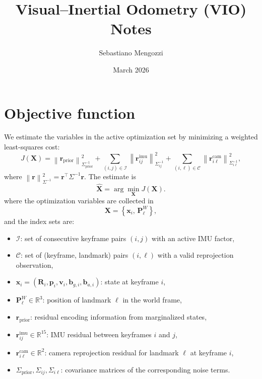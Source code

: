 \documentclass[11pt]{article}
\title{Visual--Inertial Odometry (VIO) Notes}
\author{Sebastiano Mengozzi}
\date{March 2026}
\newcommand{\R}{\mathbb{R}}
\newcommand{\norm}[1]{\left\lVert #1 \right\rVert}
\newcommand{\T}{^{\top}}
\begin{document}
\maketitle

\section{Objective function}

We estimate the variables in the active optimization set by minimizing a weighted least-squares cost:
\begin{equation}
J(\mathbf{X}) = \norm{\mathbf{r}_{\mathrm{prior}}}_{\Sigma_{\mathrm{prior}}^{-1}}^2
+ \sum_{(i,j)\in \mathcal{I}} \norm{\mathbf{r}^{\mathrm{imu}}_{ij}}_{\Sigma_{ij}^{-1}}^2
+ \sum_{(i,\ell)\in \mathcal{C}} \norm{\mathbf{r}^{\mathrm{cam}}_{i\ell}}_{\Sigma_{i\ell}^{-1}}^2,
\end{equation}
where \(\norm{\mathbf{r}}_{\Sigma^{-1}}^2 = \mathbf{r}\T \Sigma^{-1} \mathbf{r}\).
The estimate is
\begin{equation}
\hat{\mathbf{X}} = \arg\min_{\mathbf{X}} J(\mathbf{X}).
\end{equation}
where the optimization variables are collected in
\begin{equation}
\mathbf{X} = \left\{\mathbf{x}_i,\, \mathbf{P}_\ell^W\right\},
\end{equation}
and the index sets are:
\begin{itemize}
    \item \(\mathcal{I}\): set of consecutive keyframe pairs \((i,j)\) with an active IMU factor,
    \item \(\mathcal{C}\): set of (keyframe, landmark) pairs \((i,\ell)\) with a valid reprojection observation,
    \item \(\mathbf{x}_i = (\mathbf{R}_i,\mathbf{p}_i,\mathbf{v}_i,\mathbf{b}_{g,i},\mathbf{b}_{a,i})\): state at keyframe \(i\),
    \item \(\mathbf{P}_\ell^W \in \R^3\): position of landmark \(\ell\) in the world frame,
    \item \(\mathbf{r}_{\mathrm{prior}}\): residual encoding information from marginalized states,
    \item \(\mathbf{r}^{\mathrm{imu}}_{ij} \in \R^{15}\): IMU residual between keyframes \(i\) and \(j\),
    \item \(\mathbf{r}^{\mathrm{cam}}_{i\ell} \in \R^{2}\): camera reprojection residual for landmark \(\ell\) at keyframe \(i\),
    \item \(\Sigma_{\mathrm{prior}}, \Sigma_{ij}, \Sigma_{i\ell}\): covariance matrices of the corresponding noise terms.
\end{itemize}
\end{document}
